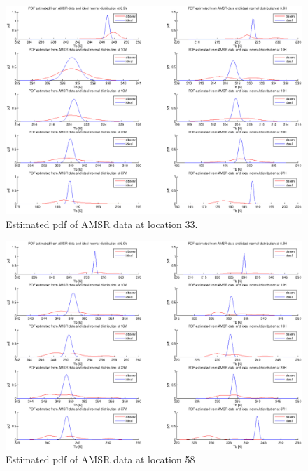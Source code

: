\begin{figure}[hbp]
  \centering
   \includegraphics[scale=0.5]{pdf33.eps} 
  \caption{Estimated pdf of AMSR data at location 33.}
  \label{fig:pdf33}
\end{figure}

\clearpage

\begin{figure}[hbp]
  \centering
   \includegraphics[scale=0.5]{pdf58.eps} 
  \caption{Estimated pdf of AMSR data at location 58}
  \label{fig:pdf58}
\end{figure}
\clearpage

